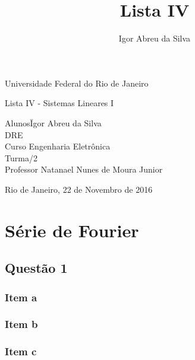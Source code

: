 \documentclass[a4paper, 12pt]{article}
\author{Igor Abreu da Silva}
\title{Lista IV}
\begin{document}
    \begin{titlepage}
        \begin{center}
            \huge{Universidade Federal do Rio de Janeiro}
            \vspace{95pt}

            \large{Lista IV - Sistemas Lineares I}
            \vspace{160pt}
        \end{center}

        \begin{flushleft}
            \begin{tabbing}
                Alunos\qquad\qquad\= Igor Abreu da Silva\\
                DRE \\
                Curso\> Engenharia Eletrônica \\
                Turma/2 \\
                Professor\> Natanael Nunes de Moura Junior \\

            \end{tabbing}

        \end{flushleft}

        \begin{center}
            \vspace{\fill}
            Rio de Janeiro, 22 de Novembro de 2016
        \end{center}
    \end{titlepage}

    \newpage
    \tableofcontents
    \listoffigures
    \thispagestyle{empty}
    \newpage

	\section{Série de Fourier}
		\subsection{Questão 1}    
			\subsubsection{Item a}
			\subsubsection{Item b}
			\subsubsection{Item c}						
\end{document}
